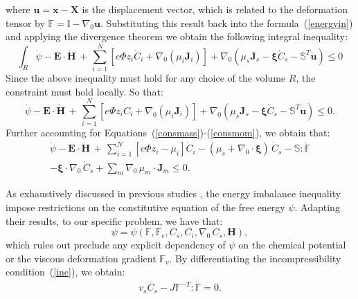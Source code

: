 \documentclass[runningheads]{llncs}
\newcommand{\F}{\ensuremath{\mathbb{F}}}
\begin{document}
where $\mathbf{u}= \mathbf{x}-\mathbf{X}$ is the displacement vector, which is related to the deformation tensor by $\F=\mathbb{I}-\nabla_0 \mathbf{u}$. Substituting this result back into the formula~(\ref{energyin}) and applying the divergence theorem we obtain the following integral inequality:
\begin{equation}
\int_R \dot{\psi} - \mathbf{E}\cdot \dot{\mathbf{H}} \, + \, \sum\limits_{i=1}^{N} \left[e \Phi  z_i \dot{C}_i+ \nabla_0 \left(\mu_i \mathbf{J}_i \right)\right] + \nabla_0 (\mu_s \mathbf{J}_s- \boldsymbol{\xi}\dot{C}_s -\mathbb{S}^T\mathbf{\dot{u}}) \leq 0 
\end{equation}
Since the above inequality must hold for any choice of the volume $R$, the constraint must hold locally. So that:
\begin{equation}
\dot{\psi} - \mathbf{E}\cdot \dot{\mathbf{H}} \, + \, \sum\limits_{i=1}^{N} \left[e \Phi  z_i \dot{C}_i+ \nabla_0 \left(\mu_i \mathbf{J}_i \right)\right] + \nabla_0 (\mu_s \mathbf{J}_s- \boldsymbol{\xi}\dot{C}_s -\mathbb{S}^T\mathbf{\dot{u}}) \leq 0. 
\end{equation}
Further accounting for Equations~(\ref{consmass})-(\ref{consmom}), we obtain that:
\begin{equation}
\begin{aligned}
\dot{\psi} - \mathbf{E}\cdot \dot{\mathbf{H}} \, + \, \sum\limits_{i=1}^{N} \left[e \Phi  z_i - \mu_i\right] \dot{C}_i - (\mu_s + \nabla_0 \cdot \boldsymbol{\xi})\,\dot{C}_s -\mathbb{S}:\dot{\F}\\
-\boldsymbol{\xi} \cdot \nabla_0 \, \dot{C}_s + \sum\limits_{m} \nabla_0 \, \mu_m \cdot \mathbf{J}_m \leq 0.
\label{temp2}
\end{aligned} 
\end{equation}

As exhaustively discussed in previous studies \cite{Plasto,GURTIN}, the energy imbalance inequality impose restrictions on the constitutive equation of the free energy $\psi$. Adapting their results, to our specific problem, we have that:
\begin{equation}
\psi = \psi (\F,\F_e, C_s, C_i, \nabla_0 \,C_s,\mathbf{H}), \label{temp1}
\end{equation}
which rules out preclude any explicit dependency of $\psi$ on the chemical potential or the viscous deformation gradient $\F_v$. By differentiating the incompressibility condition~(\ref{inc}), we obtain:
\begin{gather}
v_s\dot{C_s} - J \F^{-T}:\dot{\F} =0 \label{temp3}.
\end{gather}
\end{document}
